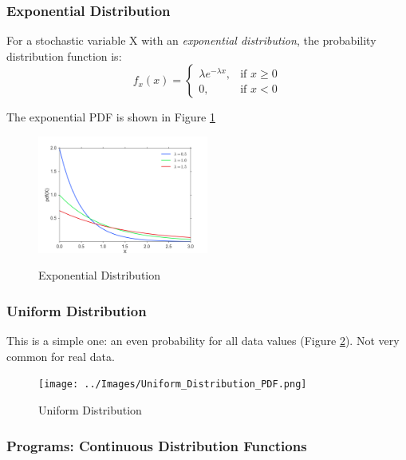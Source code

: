 \subsubsection{Exponential Distribution}

For a stochastic variable X with an \emph{exponential distribution}, the probability distribution function is:
\begin{equation}\label{eq_exponential}
f_x (x) =
  \begin{cases}
\lambda e^{- \lambda x}, & \mbox{if } x \ge 0 \\
0, & \mbox{if } x < 0
\end{cases}
\end{equation}

The exponential PDF is shown in Figure \ref{fig:exponential}
\begin{figure}
  \centering
  \includegraphics[width=0.5\textwidth]{../Images/dist_exp.png}\\
  \caption{Exponential Distribution}\label{fig:exponential}
\end{figure}


\subsubsection{Uniform Distribution}

This is a simple one: an even probability for all data values (Figure \ref{fig:uniform}). Not very common for real data.

\begin{figure}
  \centering
  \texttt{[image: ../Images/Uniform\_Distribution\_PDF.png]}\\
  \caption{Uniform Distribution} \label{fig:uniform}
\end{figure}

\subsubsection{Programs: Continuous Distribution Functions}

